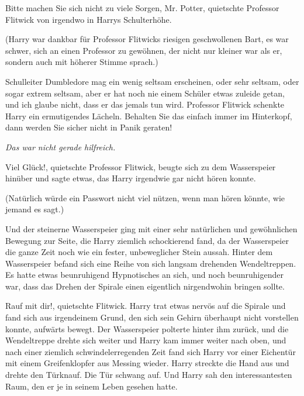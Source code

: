 \glqq{}Bitte machen Sie sich nicht zu viele Sorgen, Mr. Potter\grqq{}, quietschte
Professor Flitwick von irgendwo in Harrys Schulterhöhe.

(Harry war dankbar für Professor Flitwicks riesigen geschwollenen Bart, es war
schwer, sich an einen Professor zu gewöhnen, der nicht nur kleiner war als er,
sondern auch mit höherer Stimme sprach.)

\glqq{}Schulleiter Dumbledore mag ein wenig seltsam erscheinen, oder sehr
seltsam, oder sogar extrem seltsam, aber er hat noch nie einem Schüler etwas
zuleide getan, und ich glaube nicht, dass er das jemals tun wird.\grqq{}
Professor Flitwick schenkte Harry ein ermutigendes Lächeln. \glqq{}Behalten Sie
das einfach immer im Hinterkopf, dann werden Sie sicher nicht in Panik
geraten!\grqq{}

\emph{Das war nicht gerade hilfreich.}

\glqq{}Viel Glück!\grqq{}, quietschte Professor Flitwick, beugte sich zu dem
Wasserspeier hinüber und sagte etwas, das Harry irgendwie gar nicht hören
konnte.

(Natürlich würde ein Passwort nicht viel nützen, wenn man hören könnte, wie
jemand es sagt.)

Und der steinerne Wasserspeier ging mit einer sehr natürlichen und gewöhnlichen
Bewegung zur Seite, die Harry ziemlich schockierend fand, da der Wasserspeier
die ganze Zeit noch wie ein fester, unbeweglicher Stein aussah. Hinter dem
Wasserspeier befand sich eine Reihe von sich langsam drehenden Wendeltreppen. Es
hatte etwas beunruhigend Hypnotisches an sich, und noch beunruhigender war, dass
das Drehen der Spirale einen eigentlich nirgendwohin bringen sollte.

\glqq{}Rauf mit dir!\grqq{}, quietschte Flitwick. Harry trat etwas nervös auf die
Spirale und fand sich aus irgendeinem Grund, den sich sein Gehirn überhaupt
nicht vorstellen konnte, aufwärts bewegt. Der Wasserspeier polterte hinter ihm
zurück, und die Wendeltreppe drehte sich weiter und Harry kam immer weiter nach
oben, und nach einer ziemlich schwindelerregenden Zeit fand sich Harry vor einer
Eichentür mit einem Greifenklopfer aus Messing wieder. Harry streckte die Hand
aus und drehte den Türknauf. Die Tür schwang auf. Und Harry sah den
interessantesten Raum, den er je in seinem Leben gesehen hatte.

